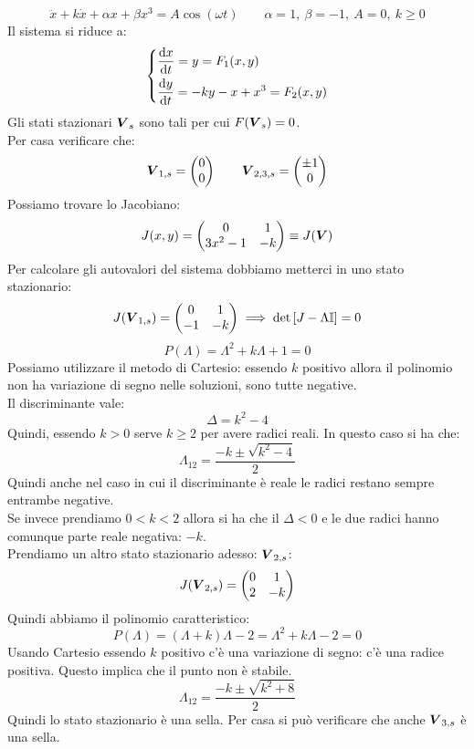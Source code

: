\begin{exmp}
    \[
    \ddot{x}+ k \dot{x}+ \alpha x + \beta x^3 = A\cos (\omega t) \qquad \alpha =1, \ \beta  = -1, \ A = 0, \ k \ge 0
    \] 
    Il sistema si riduce a:
    \[\begin{dcases}
	\frac{\text{d} x}{\text{d} t} = y = F_1(x, y)\\
	\frac{\text{d} y}{\text{d} t} = -ky -x+x^3 = F_2(x,y)
    \end{dcases}\] 
    Gli stati stazionari $\boldsymbol{V}_s$ sono tali per cui $F(\boldsymbol{V}_s)=0$.\\
    Per casa verificare che:
    \[
        \boldsymbol{V}_{1,s}=\begin{pmatrix} 0\\ 0 \end{pmatrix} \qquad \boldsymbol{V}_{2,3,s}= \begin{pmatrix} \pm 1 \\ 0 \end{pmatrix} 
    \] 
    Possiamo trovare lo Jacobiano:
    \[
	J(x,y)=
	\begin{pmatrix} 0 & 1 \\ 3x^2-1 & -k \end{pmatrix} \equiv J(\boldsymbol{V})
    \] 
    Per calcolare gli autovalori del sistema dobbiamo metterci in uno stato stazionario:
    \[
	J(\boldsymbol{V}_{1,s})=\begin{pmatrix} 0 & 1 \\ -1 & -k \end{pmatrix} \implies  \text{det}\left[J-\Lambda\mathbb{I}\right]=0
    \] 
    \[
	P(\Lambda)=\Lambda^2+k\Lambda +1=0
    \] 
    Possiamo utilizzare il metodo di Cartesio: essendo $k$ positivo allora il polinomio non ha variazione di segno nelle soluzioni, sono tutte negative.\\
    Il discriminante vale:
    \[
        \Delta =k^2-4
    \] 
    Quindi, essendo $k>0$ serve $k\ge 2$ per avere radici reali. In questo caso si ha che:
    \[
        \Lambda_{12} = \frac{-k \pm \sqrt{k^2-4} }{2}
    \] 
    Quindi anche nel caso in cui il discriminante è reale le radici restano sempre entrambe negative.\\
    Se invece prendiamo $0<k<2$ allora si ha che il $\Delta <0$ e le due radici hanno comunque parte reale negativa: $-k$.\\
    Prendiamo un altro stato stazionario adesso: $\boldsymbol{V}_{2,s}$:
    \[
	J(\boldsymbol{V}_{2,s}) = \begin{pmatrix} 0 & 1 \\ 2 & -k \end{pmatrix} 
    \] 
    Quindi abbiamo il polinomio caratteristico:
    \[
	P(\Lambda)= (\Lambda+k)\Lambda  - 2 = \Lambda^2+k\Lambda-2=0
    \] 
    Usando Cartesio essendo $k$ positivo c'è una variazione di segno: c'è una radice positiva. Questo implica che il punto non è stabile.
    \[
        \Lambda_{12} = \frac{-k\pm\sqrt{k^2+8} }{2}
    \] 
    Quindi lo stato stazionario è una sella. Per casa si può verificare che anche $\boldsymbol{V}_{3,s}$ è una sella.
\end{exmp}
\noindent
